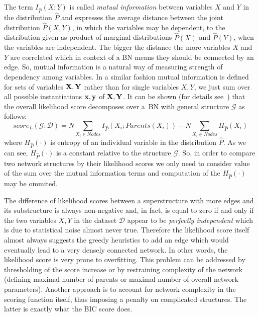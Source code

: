 \documentclass[english,cover]{fitthesis} %
\newcommand{\term}[1]{\emph{#1}}           %
\newcommand{\vars}[1]{{\bold{#1}}}         %
\begin{document}
The term $I_{\hat P}(X; Y)$ is called \term{mutual information} between variables $X$ and $Y$ in the distribution $\hat P$ and expresses the average distance between the joint distribution $\hat P(X,Y)$, in which the variables may be dependent, to the distribution given as product of marginal distributions $\hat P(X)$ and $\hat P(Y)$, when the variables are independent. The bigger the distance the more variables $X$ and $Y$ are correlated which in context of a BN means they should be connected by an edge. So, mutual information is a natural way of measuring strength of dependency among variables. In a similar fashion mutual information is defined for sets of variables $\vars{X},\vars{Y}$ rather than for single variables $X,Y$, we just sum over all possible instantiations $\vars{x},\vars{y}$ of $\vars{X},\vars{Y}$. It can be shown (for details see~\cite[p.~792]{pgm}) that the overall likelihood score decomposes over a~BN with general structure $\mathcal{G}$ as follows:
\begin{equation}
    score_L(\mathcal{G} : \mathcal{D}) = N \!\!\!\!\!\! \sum_{X_i \in Nodes} \!\!\!\!\!\! I_{\hat P}(X_i;Parents(X_i)) - N \!\!\!\!\!\! \sum_{X_i \in Nodes} \!\!\!\!\!\! H_{\hat P}(X_i)
\end{equation}
where $H_{\hat P}(\cdot)$ is entropy of an individual variable in the distribution $\hat P$. As we can see, $H_{\hat P}(\cdot)$ is a constant relative to the structure $\mathcal{G}$. So, in order to compare two network structures by their likelihood scores we only need to consider value of the sum  over the mutual information terms and computation of the $H_{\hat P}(\cdot)$ may be ommited.

\medskip
The difference of likelihood scores between a superstructure with more edges and its substructure is always non-negative and, in fact, is equal to zero if and only if the two variables $X,Y$ in the dataset $\mathcal{D}$ appear to be \emph{perfectly independent} which is due to statistical noise almost never true. Therefore the likelihood score itself almost always suggests the greedy heuristics to add an edge which would eventually lead to a very densely connected network. In other words, the likelihood score is very prone to overfitting. This problem can be addressed by thresholding of the score increase or by restraining complexity of the network (defining maximal number of parents or maximal number of overall network parameters). Another approach is to account for network complexity in the scoring function itself, thus imposing a penalty on complicated structures. The latter is exactly what the BIC score does.
\end{document}
